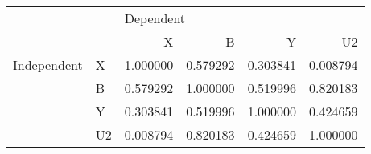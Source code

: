 \begin{tabular}{llrrrr}
\toprule
            &    & \multicolumn{4}{l}{Dependent} \\
            &    &         X &         B &         Y &        U2 \\
\midrule
Independent & X &  1.000000 &  0.579292 &  0.303841 &  0.008794 \\
            & B &  0.579292 &  1.000000 &  0.519996 &  0.820183 \\
            & Y &  0.303841 &  0.519996 &  1.000000 &  0.424659 \\
            & U2 &  0.008794 &  0.820183 &  0.424659 &  1.000000 \\
\bottomrule
\end{tabular}
